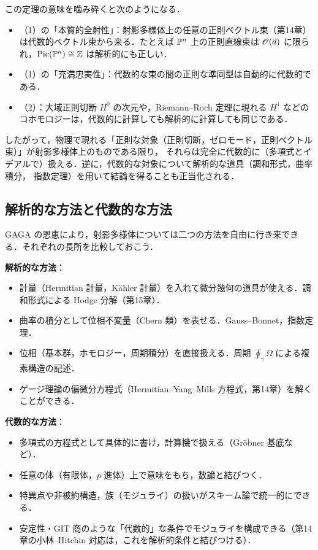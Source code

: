 この定理の意味を噛み砕くと次のようになる．
\begin{itemize}
  \item （1）の「本質的全射性」：射影多様体上の任意の正則ベクトル束（第14章）は代数的ベクトル束から来る．たとえば $\mathbb{P}^n$ 上の正則直線束は $\mathscr{O}(d)$ に限られ，$\operatorname{Pic}(\mathbb{P}^n)\cong\mathbb{Z}$ は解析的にも正しい．
  \item （1）の「充満忠実性」：代数的な束の間の正則な準同型は自動的に代数的である．
  \item （2）：大域正則切断 $H^0$ の次元や，Riemann--Roch 定理に現れる $H^1$ などのコホモロジーは，代数的に計算しても解析的に計算しても同じである．
\end{itemize}
したがって，物理で現れる「正則な対象（正則切断，ゼロモード，正則ベクトル束）」が射影多様体上のものである限り，
それらは完全に代数的に（多項式とイデアルで）扱える．逆に，代数的な対象について解析的な道具（調和形式，曲率積分，
指数定理）を用いて結論を得ることも正当化される．

\subsection{解析的な方法と代数的な方法}

GAGA の恩恵により，射影多様体については二つの方法を自由に行き来できる．それぞれの長所を比較しておこう．

\textbf{解析的な方法}：
\begin{itemize}
  \item 計量（Hermitian 計量，Kähler 計量）を入れて微分幾何の道具が使える．調和形式による Hodge 分解（第15章）．
  \item 曲率の積分として位相不変量（Chern 類）を表せる．Gauss--Bonnet，指数定理．
  \item 位相（基本群，ホモロジー，周期積分）を直接扱える．周期 $\oint_\gamma\Omega$ による複素構造の記述．
  \item ゲージ理論の偏微分方程式（Hermitian--Yang--Mills 方程式，第14章）を解くことができる．
\end{itemize}

\textbf{代数的な方法}：
\begin{itemize}
  \item 多項式の方程式として具体的に書け，計算機で扱える（Gröbner 基底など）．
  \item 任意の体（有限体，$p$ 進体）上で意味をもち，数論と結びつく．
  \item 特異点や非被約構造，族（モジュライ）の扱いがスキーム論で統一的にできる．
  \item 安定性・GIT 商のような「代数的」な条件でモジュライを構成できる（第14章の小林--Hitchin 対応は，これを解析的条件と結びつける）．
\end{itemize}

